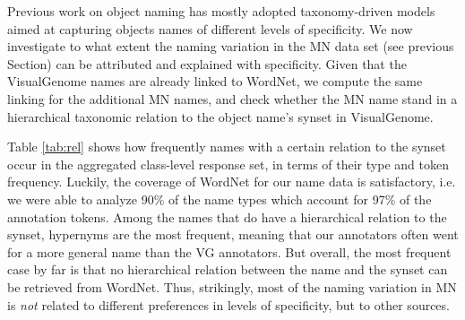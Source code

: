 Previous work on object naming has mostly adopted taxonomy-driven models aimed at capturing objects names of different levels of specificity.
 We now investigate to what extent the naming variation in the MN data set (see previous Section) can be attributed and explained with specificity. 
 Given that the VisualGenome names are already linked to WordNet, we compute the same linking for the additional MN names, and check whether the MN name stand in a hierarchical taxonomic relation to 
 the object name's synset in VisualGenome.
%

Table \ref{tab:rel} shows how frequently names with a certain relation to the synset occur in the aggregated class-level response set, in terms of their  type and token frequency. 
Luckily, the coverage of WordNet for our name data is satisfactory, i.e. we were able to analyze 90\% of the name types which account for 97\% of the annotation tokens.
Among the names that do have a hierarchical relation to the synset, hypernyms are the most frequent, meaning that our annotators often went for a more general name than the VG annotators.
But overall, the most frequent case by far is that no hierarchical relation between the name and the synset can be retrieved from WordNet.
Thus, strikingly, most of the naming variation in MN is \textit{not} related to different preferences in levels of specificity, but to other sources.

